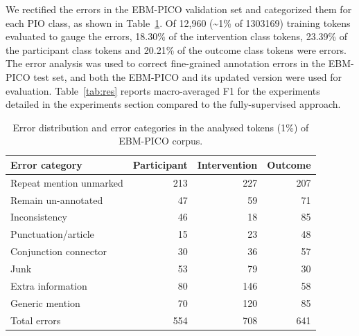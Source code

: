 \documentclass[10.7pt,]{article}
\begin{document}
%
We rectified the errors in the EBM-PICO validation set and categorized them for each PIO class, as shown in Table~\ref{tab:errordist}.
Of 12,960 (\textasciitilde1\% of 1303169) training tokens evaluated to gauge the errors, 18.30\% of the intervention class tokens, 23.39\% of the participant class tokens and 20.21\% of the outcome class tokens were errors.
The error analysis was used to correct fine-grained annotation errors in the EBM-PICO test set, and both the EBM-PICO and its updated version were used for evaluation.
Table~\ref{tab:res} reports macro-averaged F1 for the experiments detailed in the experiments section compared to the fully-supervised approach.
%
\begin{table}[!ht]
    \centering
    \begin{tabular}{|l|r|r|r|}
    \hline
        Error category & Participant & Intervention & Outcome \\ \hline
        Repeat mention unmarked & 213 & 227 & 207 \\ 
        Remain un-annotated & 47 & 59 & 71 \\ 
        Inconsistency & 46 & 18 & 85 \\ 
        Punctuation/article & 15 & 23 & 48 \\ 
        Conjunction connector & 30 & 36 & 57 \\ 
        Junk & 53 & 79 & 30 \\ 
        Extra information & 80 & 146 & 58 \\ 
        Generic mention & 70 & 120 & 85 \\ \hline
        Total errors & 554 & 708 & 641 \\ \hline
    \end{tabular}
    \caption{\label{tab:errordist} Error distribution and error categories in the analysed tokens (1\%) of EBM-PICO corpus.}
\end{table}
%
\end{document}
